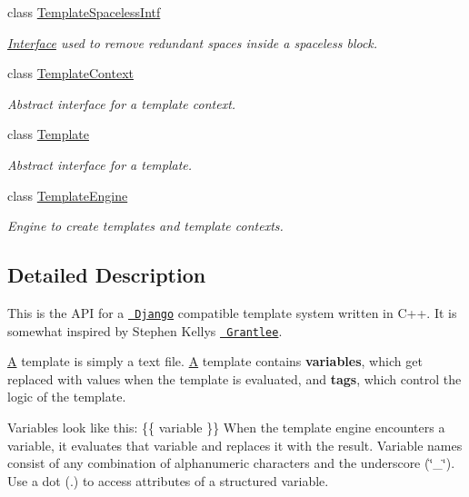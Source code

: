 \begin{DoxyCompactItemize}
class \mbox{\hyperlink{class_template_spaceless_intf}{Template\+Spaceless\+Intf}}
\begin{DoxyCompactList}\small\item\em \mbox{\hyperlink{class_interface}{Interface}} used to remove redundant spaces inside a spaceless block. \end{DoxyCompactList}\item 
class \mbox{\hyperlink{class_template_context}{Template\+Context}}
\begin{DoxyCompactList}\small\item\em Abstract interface for a template context. \end{DoxyCompactList}\item 
class \mbox{\hyperlink{class_template}{Template}}
\begin{DoxyCompactList}\small\item\em Abstract interface for a template. \end{DoxyCompactList}\item 
class \mbox{\hyperlink{class_template_engine}{Template\+Engine}}
\begin{DoxyCompactList}\small\item\em Engine to create templates and template contexts. \end{DoxyCompactList}\end{DoxyCompactItemize}


\subsection{Detailed Description}
This is the A\+PI for a \href{https://docs.djangoproject.com/en/1.6/topics/templates/}{\texttt{ Django}} compatible template system written in C++. It is somewhat inspired by Stephen Kelly\textquotesingle{}s \href{http://www.gitorious.org/grantlee/pages/Home}{\texttt{ Grantlee}}.

\mbox{\hyperlink{class_a}{A}} template is simply a text file. \mbox{\hyperlink{class_a}{A}} template contains {\bfseries{variables}}, which get replaced with values when the template is evaluated, and {\bfseries{tags}}, which control the logic of the template.

Variables look like this\+: {\ttfamily \{\{ variable \}\}} When the template engine encounters a variable, it evaluates that variable and replaces it with the result. Variable names consist of any combination of alphanumeric characters and the underscore (\char`\"{}\+\_\+\char`\"{}). Use a dot (.) to access attributes of a structured variable.

